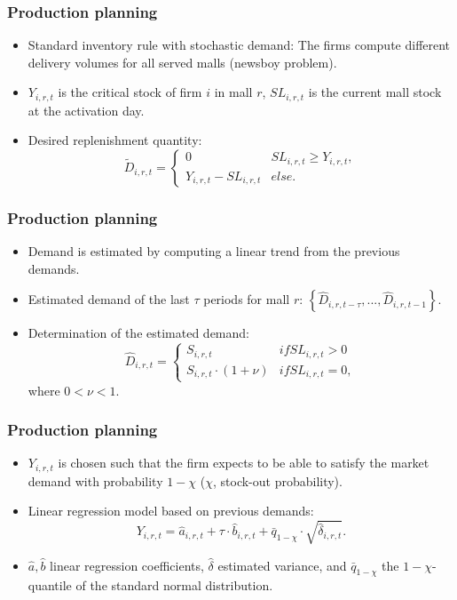 \documentclass{beamer}
\begin{document}
\frame
{
  \frametitle{Production planning} 
\begin{itemize}
	\item Standard inventory rule with stochastic demand: The firms compute different delivery volumes for all served malls (newsboy problem).
	
	\item $Y_{i,r,t}$ is the critical stock of firm $i$ in mall $r$, $SL_{i,r,t}$ is the current mall stock at the activation day.
		
	\item Desired replenishment quantity:
	\[
			\tilde{D}_{i,r,t}= \begin{cases} 0 & SL_{i,r,t}\geq Y_{i,r,t},\\
																			Y_{i,r,t} -  SL_{i,r,t} &else. 
			
			 \end{cases}
	\]
	
	
	\end{itemize}


}

\frame
{

  \frametitle{Production planning} 
\begin{itemize}

\item Demand is estimated by computing a linear trend from the previous demands.

\item Estimated demand of the last $\tau$ periods for mall $r$: $\left\{ \hat{D}_{i,r,t-\tau},...,\hat{D}_{i,r,t-1} \right\}$.

\item Determination of the estimated demand:  
		\[
				\hat{D}_{i,r,t}=\begin{cases}  S_{i,r,t} & if SL_{i,r,t}>0 \\ S_{i,r,t}\cdot (1+ \nu) & if SL_{i,r,t}=0, \end{cases}
		\]
		where $0 < \nu < 1$.
\end{itemize}
  
}


\frame
{
  \frametitle{Production planning} 
\begin{itemize}
	
	
	\item $Y_{i,r,t}$ is chosen such that the firm expects to be able to satisfy the market demand with probability $1-\chi$ ($\chi$, stock-out probability).
	
	\item Linear regression model based on previous demands:
	\[
			Y_{i,r,t}= \hat{a}_{i,r,t}+\tau \cdot \hat{b}_{i,r,t}+\bar{q}_{1-\chi}\cdot \sqrt{\hat{\delta}_{i,r,t}}.
	\]
	
	\item $\hat{a}, \hat{b}$ linear regression coefficients, $\hat{\delta}$ estimated variance, and $\bar{q}_{1-\chi}$ the $1-\chi$-quantile of the standard normal distribution. 
	\end{itemize}


}
\end{document}
